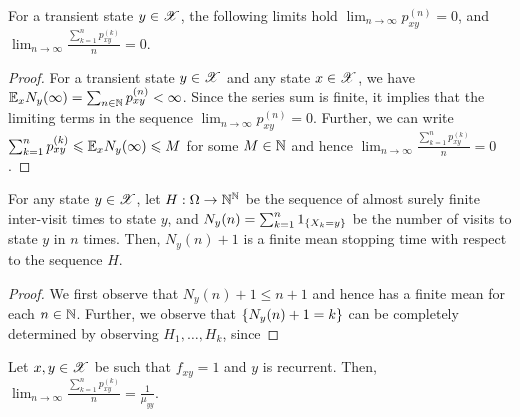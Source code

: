\documentclass[letterpaper,10pt,english]{article}
\begin{document}
\begin{cor} 
For a transient state $y \in \mathscr{X}$, the following limits hold 
$\lim_{n \to \infty}p_{xy}^{(n)} = 0$, and $\lim_{n \to \infty}\frac{\sum_{k = 1}^np_{xy}^{(k)}}{n} = 0$.
\end{cor}
\begin{proof} 
For a transient state $y \in \mathscr{X}$ and any state $x \in \mathscr{X}$, we have $\mathbb{E}_xN_y(\infty)  = \sum_{n \in \mathbb{N}}p_{xy}^{(n)} < \infty$. 
Since the series sum is finite, it implies that the limiting terms in the sequence $\lim_{n \to \infty}p_{xy}^{(n)} = 0$. 
Further, we can write $\sum_{k=1}^np_{xy}^{(k)} \leqslant \mathbb{E}_xN_y(\infty) \leqslant M$ for some $M \in \mathbb{N}$ and hence $\lim_{n \to \infty}\frac{\sum_{k = 1}^np_{xy}^{(k)}}{n} = 0$.
\end{proof}
\begin{lem} 
\label{lem:StoppingTime}
For any state $y \in \mathscr{X}$, let $H:\Omega\to\mathbb{N}^{\mathbb{N}}$ be the sequence of almost surely finite inter-visit times to state $y$, 
and $N_y(n) = \sum_{k=1}^n1_{\left\{X_k = y\right\}}$ be the number of visits to state $y$ in $n$ times. 
Then, $N_y(n) +1$ is a finite mean stopping time with respect to the sequence $H$. 
\end{lem}
\begin{proof} 
We first observe that $N_y(n) + 1 \le n+1$ and hence has a finite mean for each $n \in \mathbb{N}$. 
Further, we observe that $\left\{N_y(n) + 1 = k\right\}$ can be completely determined by observing $H_1, \dots, H_k$, since 
\end{proof}
\begin{thm} 
Let $x, y \in \mathscr{X}$ be such that $f_{xy} = 1$ and $y$ is recurrent.  
Then, $\lim_{n \to \infty}\frac{\sum_{k=1}^np_{xy}^{(k)}}{n} = \frac{1}{\mu_{yy}}$. 
\end{thm}
\end{document}
